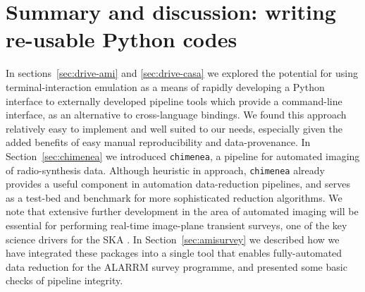 \documentclass[5p,authoryear]{elsarticle}
\begin{document}
\section{Summary and discussion: writing re-usable Python codes}
\label{sec:conclusion}
In sections~\ref{sec:drive-ami} and \ref{sec:drive-casa} we explored the potential for using terminal-interaction emulation as a means of rapidly developing a Python interface to externally developed pipeline tools which provide a command-line interface, as an alternative to cross-language bindings. 
We found this approach relatively easy to implement and well suited to our needs, especially given the added benefits of easy manual reproducibility and data-provenance. 
In Section~\ref{sec:chimenea} we introduced \texttt{chimenea}, a pipeline for automated imaging of radio-synthesis data. 
Although heuristic in approach, \texttt{chimenea} already provides a useful component in automation data-reduction pipelines, and serves as a test-bed and benchmark for more sophisticated reduction algorithms. 
We note that extensive further development in the area of automated imaging will be essential for performing real-time image-plane transient surveys, one of the key science drivers for the SKA \citep{Burlon2015,Corbel2015,PerezTorres2014}.
In Section~\ref{sec:amisurvey} we described how we have integrated these packages into a single tool that enables fully-automated data reduction for the ALARRM survey programme, and presented some basic checks of pipeline integrity.
\end{document}
